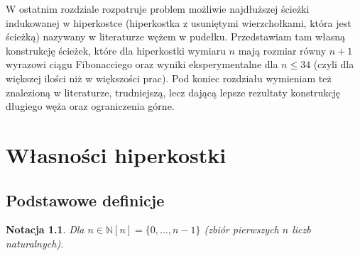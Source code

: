 \documentclass{pracamgr}
\newtheorem{note}[theorem]{Notacja}
\begin{document}
  W ostatnim rozdziale rozpatruje problem możliwie najdłuższej ścieżki indukowanej w hiperkostce (hiperkostka z usuniętymi wierzchołkami, która jest ścieżką)
  nazywany w literaturze wężem w pudełku. Przedstawiam tam własną konstrukcję ścieżek, które dla hiperkostki wymiaru $n$ mają rozmiar równy $n+1$
  wyrazowi ciągu Fibonacciego oraz wyniki eksperymentalne dla $n\le34$ (czyli dla większej ilości niż w większości prac).
  Pod koniec rozdziału wymieniam też znalezioną w literaturze, trudniejszą, lecz dającą lepsze rezultaty konstrukcję długiego węża oraz
  ograniczenia górne.

  
  
 \chapter{Własności hiperkostki}
  \section{Podstawowe definicje}
   \begin{note}\label{[n]}
    Dla $n\in\mathbb{N}$\quad $[n]=\{0,...,n-1\}$ (zbiór pierwszych $n$ liczb naturalnych).
   \end{note}
\end{document}
